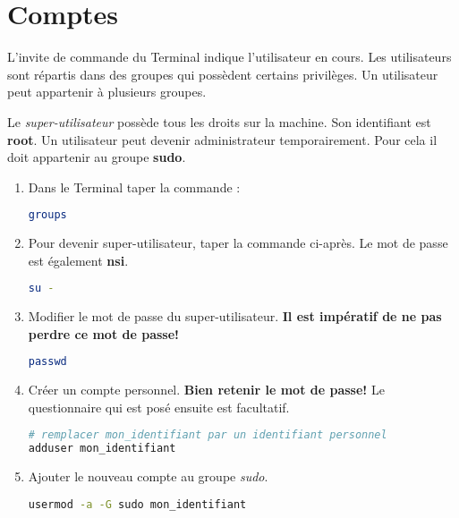 \documentclass[a4paper,11pt]{article}
\begin{document}
\section{Comptes}
L'invite de commande du Terminal indique l'utilisateur en cours. Les utilisateurs sont répartis dans des groupes qui possèdent certains privilèges. Un utilisateur peut appartenir à plusieurs groupes.
\begin{aretenir}[]
    Le \emph{super-utilisateur} possède tous les droits sur la machine. Son identifiant est \textbf{root}. Un utilisateur peut devenir administrateur temporairement. Pour cela il doit appartenir au groupe \textbf{sudo}.
\end{aretenir}
\begin{activite}
    \begin{enumerate}
        \item Dans le Terminal taper la commande :
              \begin{lstlisting}[language=bash]
groups
    \end{lstlisting}
        \item Pour devenir super-utilisateur, taper la commande ci-après. Le mot de passe est également \textbf{nsi}.
              \begin{lstlisting}[language=bash]
su -
        \end{lstlisting}
        \item Modifier le mot de passe du super-utilisateur. \textbf{Il est impératif de ne pas perdre ce mot de passe!}
        \begin{lstlisting}[language=bash]
passwd
            \end{lstlisting}
        \begin{center}
        \end{center}
        \item Créer un compte personnel. \textbf{Bien retenir le mot de passe!} Le questionnaire qui est posé ensuite est facultatif.
        \begin{lstlisting}[language=bash]
# remplacer mon_identifiant par un identifiant personnel
adduser mon_identifiant
            \end{lstlisting}
        \item Ajouter le nouveau compte au groupe \emph{sudo}.
        \begin{lstlisting}[language=bash]
usermod -a -G sudo mon_identifiant
            \end{lstlisting}

\end{enumerate}
\end{activite}
\end{document}
